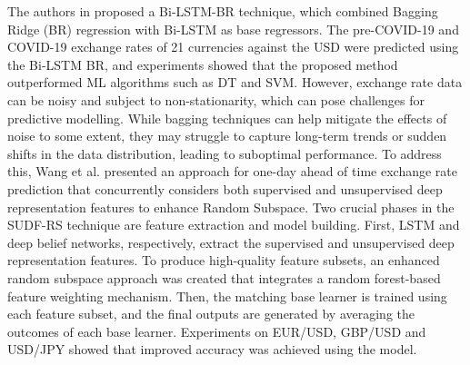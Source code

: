 \documentclass[preprint,12pt]{elsarticle}
\begin{document}
The authors in \citep{abedin2021deep} proposed a Bi-LSTM-BR technique, which combined Bagging Ridge (BR) regression with Bi-LSTM as base regressors. The pre-COVID-19 and COVID-19 exchange rates of 21 currencies against the USD were predicted using the Bi-LSTM BR, and experiments showed that the proposed method outperformed ML algorithms such as DT and SVM. However, exchange rate data can be noisy and subject to non-stationarity, which can pose challenges for predictive modelling. While bagging techniques can help mitigate the effects of noise to some extent, they may struggle to capture long-term trends or sudden shifts in the data distribution, leading to suboptimal performance. To address this, Wang et al. \citep{wang_sudf-rs_2023} presented an approach for one-day ahead of time exchange rate prediction that concurrently considers both supervised and unsupervised deep representation features to enhance Random Subspace. Two crucial phases in the SUDF-RS technique are feature extraction and model building. First, LSTM and deep belief networks, respectively, extract the supervised and unsupervised deep representation features. To produce high-quality feature subsets, an enhanced random subspace approach was created that integrates a random forest-based feature weighting mechanism. Then, the matching base learner is trained using each feature subset, and the final outputs are generated by averaging the outcomes of each base learner. Experiments on EUR/USD, GBP/USD and USD/JPY showed that improved accuracy was achieved using the model.
\end{document}
